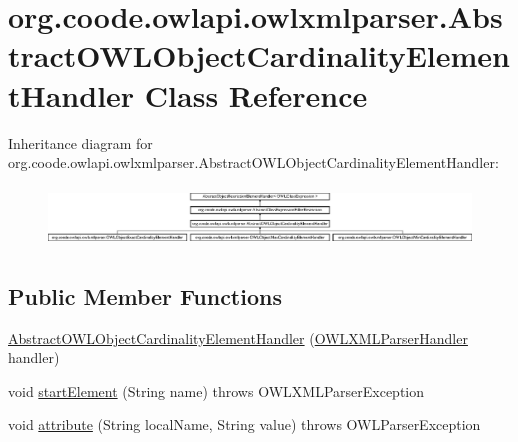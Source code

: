 \hypertarget{classorg_1_1coode_1_1owlapi_1_1owlxmlparser_1_1_abstract_o_w_l_object_cardinality_element_handler}{\section{org.\-coode.\-owlapi.\-owlxmlparser.\-Abstract\-O\-W\-L\-Object\-Cardinality\-Element\-Handler Class Reference}
\label{classorg_1_1coode_1_1owlapi_1_1owlxmlparser_1_1_abstract_o_w_l_object_cardinality_element_handler}
}
Inheritance diagram for org.\-coode.\-owlapi.\-owlxmlparser.\-Abstract\-O\-W\-L\-Object\-Cardinality\-Element\-Handler\-:\begin{figure}[H]
\begin{center}
\leavevmode
\includegraphics[height=1.616162cm]{classorg_1_1coode_1_1owlapi_1_1owlxmlparser_1_1_abstract_o_w_l_object_cardinality_element_handler}
\end{center}
\end{figure}
\subsection*{Public Member Functions}
\begin{DoxyCompactItemize}
\item 
\hyperlink{classorg_1_1coode_1_1owlapi_1_1owlxmlparser_1_1_abstract_o_w_l_object_cardinality_element_handler_aa23471cc9dcd424443dcbe9c498f865a}{Abstract\-O\-W\-L\-Object\-Cardinality\-Element\-Handler} (\hyperlink{classorg_1_1coode_1_1owlapi_1_1owlxmlparser_1_1_o_w_l_x_m_l_parser_handler}{O\-W\-L\-X\-M\-L\-Parser\-Handler} handler)
\item 
void \hyperlink{classorg_1_1coode_1_1owlapi_1_1owlxmlparser_1_1_abstract_o_w_l_object_cardinality_element_handler_a38e425610b96f9e8a01cd854c0bd965b}{start\-Element} (String name)  throws O\-W\-L\-X\-M\-L\-Parser\-Exception 
\item 
void \hyperlink{classorg_1_1coode_1_1owlapi_1_1owlxmlparser_1_1_abstract_o_w_l_object_cardinality_element_handler_a9bdfca5c76ea59b462935759d4af5f74}{attribute} (String local\-Name, String value)  throws O\-W\-L\-Parser\-Exception 
\end{DoxyCompactItemize}
